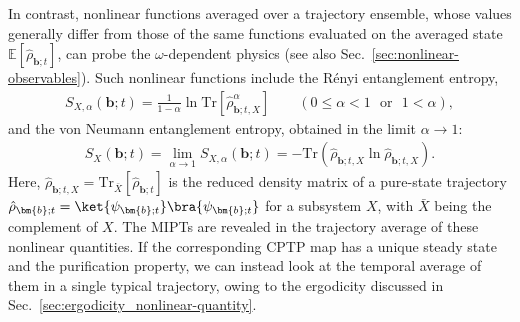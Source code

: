 \documentclass[preprint,pteplogo]{ptephy_v2}%
\numberwithin{equation}{section}
\theoremstyle{definition}
\newcommand{\mr}[1]{\mathrm{#1}}
\newcommand{\Tr}{\mr{Tr}}
\begin{document}
In contrast, nonlinear functions averaged over a trajectory ensemble, whose values generally differ from those of the same functions evaluated on the averaged state $\mathbb{E}[\hat{\rho}_{\bm{b};t}]$, can probe the $\omega$-dependent physics (see also Sec.~\ref{sec:nonlinear-observables}).
Such nonlinear functions include the R\'enyi entanglement entropy,
\begin{align}
    S_{X,\alpha}(\bm{b};\!t) = \frac{1}{1-\alpha}\ln\Tr [\hat{\rho}_{\bm{b};t, X}^\alpha]
    \qquad (0\leq\alpha<1\:\:\:\mathrm{or}\:\:\:1<\alpha),
\end{align}
and the von Neumann entanglement entropy, obtained in the limit $\alpha\to1$:
\begin{align}
    S_{X}(\bm{b};\!t) = \lim_{\alpha\to1}S_{X,\alpha}(\bm{b};\!t) =  -\Tr \left(\hat{\rho}_{\bm{b};t, X} \ln \hat{\rho}_{\bm{b};t, X}\right).
\end{align}
Here, $\hat{\rho}_{\bm{b};t, X} = \Tr_{\bar{X}}[\hat{\rho}_{\bm{b};t}]$ is the reduced density matrix of a pure-state trajectory $\hat{\rho}_{\bm{b};t} = \ket{\psi_{\bm{b};t}}\bra{\psi_{\bm{b};t}}$ for a subsystem $X$, with $\bar{X}$ being the complement of $X$.
The MIPTs are revealed in the trajectory average of these nonlinear quantities.
If the corresponding CPTP map has a unique steady state and the purification property, we can instead look at the temporal average of them in a single typical trajectory, owing to the ergodicity discussed in Sec.~\ref{sec:ergodicity_nonlinear-quantity}. 
\end{document}
